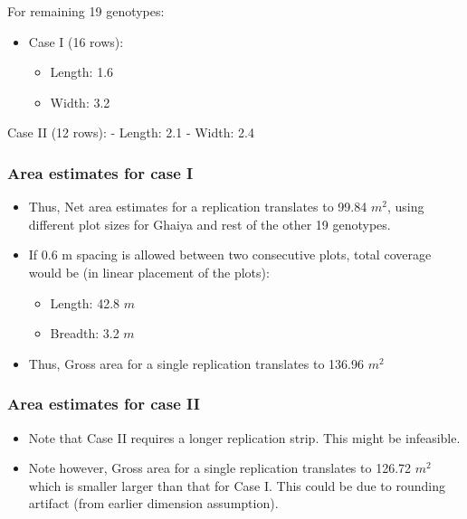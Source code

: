 \documentclass[12pt,]{article}
\providecommand{\tightlist}{%
  \setlength{\itemsep}{0pt}\setlength{\parskip}{0pt}}
\begin{document}
For remaining 19 genotypes:

\begin{itemize}
\tightlist
\item
  Case I (16 rows):

  \begin{itemize}
  \tightlist
  \item
    Length: 1.6
  \item
    Width: 3.2
  \end{itemize}
\end{itemize}

Case II (12 rows):
- Length: 2.1
- Width: 2.4

\hypertarget{area-estimates-for-case-i}{%
\subsubsection{Area estimates for case I}\label{area-estimates-for-case-i}}

\begin{itemize}
\tightlist
\item
  Thus, Net area estimates for a replication translates to 99.84 \(m^2\), using different plot sizes for Ghaiya and rest of the other 19 genotypes.
\item
  If 0.6 m spacing is allowed between two consecutive plots, total coverage would be (in linear placement of the plots):

  \begin{itemize}
  \tightlist
  \item
    Length: 42.8 \(m\)
  \item
    Breadth: 3.2 \(m\)
  \end{itemize}
\item
  Thus, Gross area for a single replication translates to 136.96 \(m^2\)
\end{itemize}

\hypertarget{area-estimates-for-case-ii}{%
\subsubsection{Area estimates for case II}\label{area-estimates-for-case-ii}}

\begin{itemize}
\tightlist
\item
  Note that Case II requires a longer replication strip. This might be infeasible.
\item
  Note however, Gross area for a single replication translates to 126.72 \(m^2\) which is smaller larger than that for Case I. This could be due to rounding artifact (from earlier dimension assumption).
\end{itemize}
\end{document}
